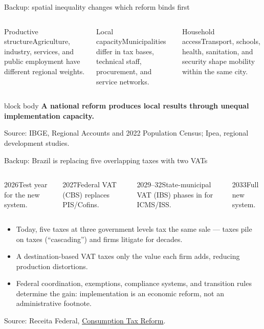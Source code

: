 \documentclass[10pt,aspectratio=169]{beamer}
\newcommand{\source}[1]{%
  \par\vfill{\tiny\color{MidGray}Source: #1}}
\newcommand{\question}[1]{%
  \begin{beamercolorbox}[rounded=true,sep=0.55em,wd=\textwidth]{block body}
    \centering\large\textbf{#1}
  \end{beamercolorbox}}
\begin{document}
\begin{frame}{Backup: spatial inequality changes which reform binds first}
  \begin{columns}[T,onlytextwidth]
    \begin{block}{Productive structure}Agriculture, industry, services, and public employment have different regional weights.\end{block}
    \begin{block}{Local capacity}Municipalities differ in tax bases, technical staff, procurement, and service networks.\end{block}
    \begin{block}{Household access}Transport, schools, health, sanitation, and security shape mobility within the same city.\end{block}
  \end{columns}
  \vspace{.65cm}
  \question{A national reform produces local results through unequal implementation capacity.}
  \source{IBGE, Regional Accounts and 2022 Population Census; Ipea, regional development studies.}
\end{frame}

\begin{frame}{Backup: Brazil is replacing five overlapping taxes with two VATs}
  \begin{columns}[T,onlytextwidth]
    \begin{block}{2026}Test year for the new system.\end{block}
    \begin{block}{2027}Federal VAT (CBS) replaces PIS/Cofins.\end{block}
    \begin{block}{2029--32}State-municipal VAT (IBS) phases in for ICMS/ISS.\end{block}
    \begin{block}{2033}Full new system.\end{block}
  \end{columns}
  \vspace{.45cm}
  \begin{itemize}
    \item Today, five taxes at three government levels tax the same sale --- taxes pile on taxes (``cascading'') and firms litigate for decades.
    \item A destination-based VAT taxes only the value each firm adds, reducing production distortions.
    \item Federal coordination, exemptions, compliance systems, and transition rules determine the gain: implementation is an economic reform, not an administrative footnote.
  \end{itemize}
  \source{Receita Federal, \href{https://www.gov.br/receitafederal/pt-br/acesso-a-informacao/acoes-e-programas/programas-e-atividades/reforma-tributaria-do-consumo/entenda}{Consumption Tax Reform}.}
\end{frame}
\end{document}
